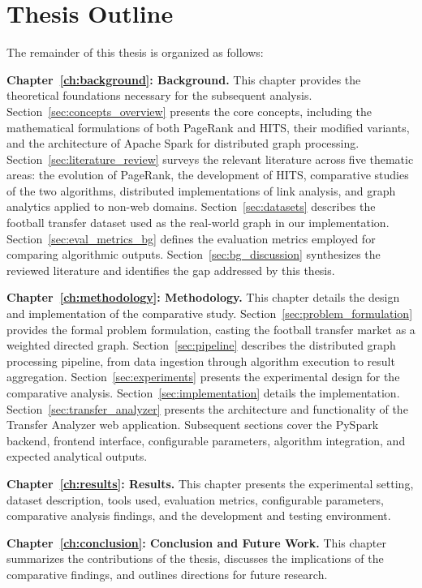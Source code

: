 \section{Thesis Outline}
\label{sec:thesis_outline}

The remainder of this thesis is organized as follows:

\textbf{Chapter~\ref{ch:background}: Background.} This chapter provides the theoretical foundations necessary for the subsequent analysis. Section~\ref{sec:concepts_overview} presents the core concepts, including the mathematical formulations of both PageRank and HITS, their modified variants, and the architecture of Apache Spark for distributed graph processing. Section~\ref{sec:literature_review} surveys the relevant literature across five thematic areas: the evolution of PageRank, the development of HITS, comparative studies of the two algorithms, distributed implementations of link analysis, and graph analytics applied to non-web domains. Section~\ref{sec:datasets} describes the football transfer dataset used as the real-world graph in our implementation. Section~\ref{sec:eval_metrics_bg} defines the evaluation metrics employed for comparing algorithmic outputs. Section~\ref{sec:bg_discussion} synthesizes the reviewed literature and identifies the gap addressed by this thesis.

\textbf{Chapter~\ref{ch:methodology}: Methodology.} This chapter details the design and implementation of the comparative study. Section~\ref{sec:problem_formulation} provides the formal problem formulation, casting the football transfer market as a weighted directed graph. Section~\ref{sec:pipeline} describes the distributed graph processing pipeline, from data ingestion through algorithm execution to result aggregation. Section~\ref{sec:experiments} presents the experimental design for the comparative analysis. Section~\ref{sec:implementation} details the implementation. Section~\ref{sec:transfer_analyzer} presents the architecture and functionality of the Transfer Analyzer web application. Subsequent sections cover the PySpark backend, frontend interface, configurable parameters, algorithm integration, and expected analytical outputs.

\textbf{Chapter~\ref{ch:results}: Results.} This chapter presents the experimental setting, dataset description, tools used, evaluation metrics, configurable parameters, comparative analysis findings, and the development and testing environment.

\textbf{Chapter~\ref{ch:conclusion}: Conclusion and Future Work.} This chapter summarizes the contributions of the thesis, discusses the implications of the comparative findings, and outlines directions for future research.